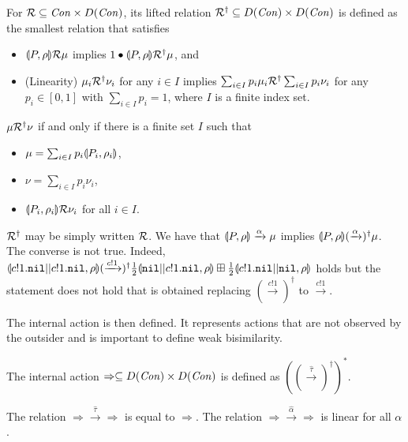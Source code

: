 \begin{defi}
 For $\mathcal{R} \subseteq \mathit{Con} \times D(\mathit{Con})$, its lifted
 relation $\mathcal{R}^\dagger \subseteq D(\mathit{Con}) \times
 D(\mathit{Con})$ is defined as the smallest relation that satisfies
 \begin{itemize}
  \item $\llparenthesis P, \rho \rrparenthesis \mathcal{R} \mu$ implies
	$1 \bullet \llparenthesis P, \rho \rrparenthesis \mathcal{R}^\dagger \mu$,
	and
  \item (Linearity) $\mu_i \mathcal{R}^\dagger \nu_i$
	for any $i \in I$ implies
	$\sum_{i \in I}p_i \mu_i \mathcal{R}^\dagger
	\sum_{i \in I}p_i \nu_i$ for any $p_i \in [0,1]$ with 
	$\sum_{i \in I} p_i = 1$, where $I$ is a finite
	index set.
 \end{itemize}
\end{defi}

\begin{prop}
 $\mu \mathcal{R}^\dagger \nu$ if and only if there is a 
 finite set $I$ such that
 \begin{itemize}
  \item $\mu = \sum_{i \in I} p_i \llparenthesis P_i, \rho_i \rrparenthesis$,
  \item $\nu = \sum_{i \in I} p_i \nu_i$,
  \item $\llparenthesis P_i, \rho_i \rrparenthesis \mathcal{R} \nu_i$ for all
	$i \in I$.
 \end{itemize}
\end{prop}

$\mathcal{R}^\dagger$ may be simply written
 $\mathcal{R}$. We have that
$\llparenthesis P, \rho \rrparenthesis \xrightarrow{\alpha} \mu$ implies 
$\llparenthesis P, \rho \rrparenthesis (\xrightarrow{\alpha})^\dagger \mu$. 
The converse is not true. Indeed, $\llparenthesis c!1.\mathtt{nil}||c!1.\mathtt{nil}, \rho \rrparenthesis
 (\xrightarrow{c!1})^\dagger \frac{1}{2}\llparenthesis \mathtt{nil}||c!1.\mathtt{nil}, \rho \rrparenthesis \boxplus
\frac{1}{2}\llparenthesis c!1.\mathtt{nil}||\mathtt{nil}, \rho \rrparenthesis$ holds but the statement does not
 hold that is obtained replacing $(\xrightarrow{c!1})^\dagger$ to 
$\xrightarrow{c!1}$.

The internal action is then defined. It represents actions that are
not observed by the outsider and is important to define weak bisimilarity.
\begin{defi}
The internal action $\Rightarrow \subseteq
D(\mathit{Con}) \times D(\mathit{Con})$ is defined as $((\xrightarrow{\hat
 \tau})^\dagger)^{\ast}$.
\end{defi}

\begin{prop}
 The relation 
 $\Rightarrow \xrightarrow{\hat \tau} \Rightarrow$ is equal to
 $\Rightarrow$.
 The relation $\Rightarrow \xrightarrow{\hat \alpha} \Rightarrow$
 is linear for all $\alpha$.
\end{prop}


